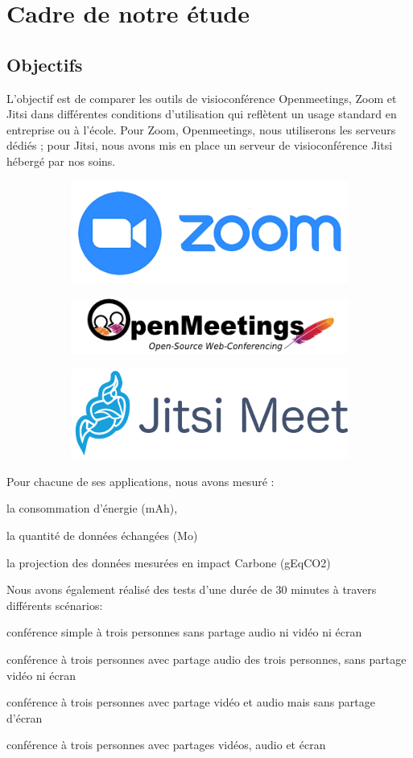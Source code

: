 \documentclass[11pt,a4paper]{report}
\begin{document}
\chapter{Cadre de notre étude}
\section{Objectifs}
L'objectif est de comparer les outils de visioconférence Openmeetings, Zoom et Jitsi dans différentes conditions d'utilisation qui reflètent un usage standard en entreprise ou à l'école. Pour Zoom, Openmeetings, nous utiliserons les serveurs dédiés ; pour Jitsi, nous avons mis en place un serveur de visioconférence Jitsi hébergé par nos soins.

\begin{figure}[h]
\begin{subfigure}
  \centering
  \includegraphics[width=.3\linewidth]{zoom-logo (1).png}
\end{subfigure}
\begin{subfigure}
  \centering
  \includegraphics[width=.3\linewidth]{logo.png}
\end{subfigure}
\begin{subfigure}
  \centering
  \includegraphics[width=.3\linewidth]{logo-jitsi-meet.png}
\end{subfigure}
\end{figure}

Pour chacune de ses applications, nous avons mesuré :
\bi \item la consommation d’énergie (mAh),
\item la quantité de données échangées (Mo)
\item la projection des données mesurées en impact Carbone (gEqCO2)
\ei

Nous avons également réalisé des tests d'une durée de 30 minutes à travers différents scénarios:
\bi \item conférence simple à trois personnes sans partage audio ni vidéo ni écran 
\item conférence à trois personnes avec partage audio des trois personnes, sans partage vidéo ni écran
\item conférence à trois personnes avec partage vidéo et audio mais sans partage d'écran
\item conférence à trois personnes avec partages vidéos, audio et écran \ei 
\end{document}
